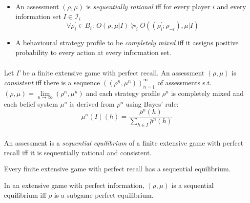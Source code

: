 \documentclass[UTF8,11pt,colorlinks,compress,openany]{beamer}%
\begin{document}
\begin{frame}\frametitle{}
\begin{itemize}
	\item An assessment $(\rho,\mu)$ is \emph{sequentially rational} iff for every player $i$ and every information set $I\in\mathcal{I}_i$
\[\forall \rho_i^\prime\in B_i:\, O(\rho,\mu|I)\succcurlyeq_i O((\rho_i^\prime;\rho_{-i}),\mu|I)\]
	\item A behavioural strategy profile to be \emph{\emph{completely mixed}} iff it assigns positive probability to every action at every information set.
\end{itemize}
\end{frame}

\begin{frame}\frametitle{}
\begin{definition}
	Let $\Gamma$ be a finite extensive game with perfect recall. An assessment $(\rho,\mu)$ is \emph{consistent} iff there is a sequence $((\rho^n,\mu^n))_{n=1}^\infty$ of assessments s.t. $(\rho,\mu)=\lim\limits_{n\to\infty}(\rho^n,\mu^n)$ and each strategy profile $\rho^n$ is completely mixed and each belief system $\mu^n$ is derived from $\rho^n$ using Bayes' rule: \[\mu^n(I)(h)=\dfrac{\overline{\rho}^n(h)}{\sum\limits_{h\in I}\overline{\rho}^n(h)}\]
\end{definition}
\end{frame}

\begin{frame}\frametitle{}
\begin{definition}
	An assessment is a \emph{sequential equilibrium} of a finite extensive game with perfect recall iff it is sequentially rational and consistent.
\end{definition}
\begin{theorem}
	Every finite extensive game with perfect recall has a sequential equilibrium.
\end{theorem}
\begin{theorem}
	In an extensive game with perfect information, $(\rho,\mu)$ is a sequential equilibrium iff $\rho$ is a subgame perfect equilibrium.
\end{theorem}
\end{frame}
\end{document}
